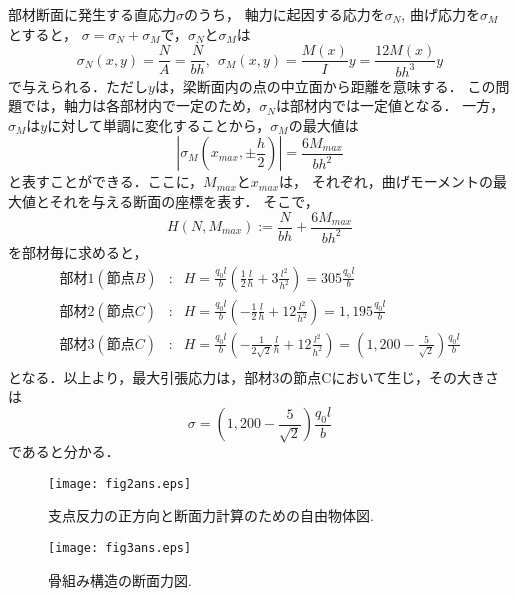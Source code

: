 ﻿\documentclass[10pt,a4j]{jarticle}
\begin{document}
\begin{enumerate}
部材断面に発生する直応力$\sigma$のうち，
軸力に起因する応力を$\sigma_N$, 曲げ応力を$\sigma_M$とすると，
$\sigma=\sigma_N+\sigma_M$で，$\sigma_N$と$\sigma_M$は
\begin{equation}
	\sigma_N(x,y)=\frac{N}{A}=\frac{N}{bh}, \ \
	\sigma_M(x,y)=\frac{M(x)}{I}y=\frac{12M(x)}{bh^3}y
	\label{eqn:}
\end{equation}
で与えられる．ただし$y$は，梁断面内の点の中立面から距離を意味する．
この問題では，軸力は各部材内で一定のため，$\sigma_N$は部材内では一定値となる．
一方，$\sigma_M$は$y$に対して単調に変化することから，$\sigma_M$の最大値は
\begin{equation}
	\left| \sigma_M\left(x_{max},\pm \frac{h}{2}\right)\right|=\frac{6M_{max}}{bh^2}
	\label{eqn:eq_lbl}
\end{equation}
と表すことができる．ここに，$M_{max}$と$x_{max}$は，
それぞれ，曲げモーメントの最大値とそれを与える断面の座標を表す．
そこで，
\begin{equation}
	H(N,M_{max}):=\frac{N}{bh}+\frac{6M_{max}}{bh^2}
	\label{eqn:cost}
\end{equation}
を部材毎に求めると，
\begin{eqnarray}
	部材1(節点B) &:& H=\frac{q_0l}{b}\left( \frac{1}{2}\frac{l}{h}+3\frac{l^2}{h^2}\right)=305\frac{q_0l}{b}\\
	部材2(節点C) &:& H=\frac{q_0l}{b}\left( -\frac{1}{2}\frac{l}{h}+12\frac{l^2}{h^2}\right)=1,195\frac{q_0l}{b}\\
	部材3(節点C) &:& H=\frac{q_0l}{b}\left( -\frac{1}{2\sqrt{2}}\frac{l}{h}+12\frac{l^2}{h^2}\right)=
	\left(1,200-\frac{5}{\sqrt{2}}\right)\frac{q_0l}{b}\\
	\label{eqn:Hvals}
\end{eqnarray}
となる．以上より，最大引張応力は，部材3の節点Cにおいて生じ，その大きさは
\begin{equation}
	\sigma=\left(1,200-\frac{5}{\sqrt{2}}\right)\frac{q_0l}{b}
	\label{eqn:sig_max}
\end{equation}
であると分かる．
\end{enumerate}
\begin{figure}[h]
	\begin{center}
	\texttt{[image: fig2ans.eps]} 
	\end{center}
	\caption{支点反力の正方向と断面力計算のための自由物体図.} 
	\label{fig:fig2}
\end{figure}
\begin{figure}[h]
	\begin{center}
	\texttt{[image: fig3ans.eps]} 
	\end{center}
	\caption{骨組み構造の断面力図.} 
	\label{fig:fig3}
\end{figure}
\end{document}
